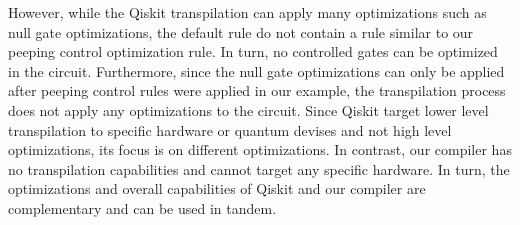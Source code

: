 However, while the Qiskit transpilation can apply many optimizations such as null gate optimizations, the default rule do not contain a rule similar to our peeping control optimization rule. In turn, no controlled gates can be optimized in the circuit. Furthermore, since the null gate optimizations can only be applied after peeping control rules were applied in our example, the transpilation process does not apply any optimizations to the circuit. Since Qiskit target lower level transpilation to specific hardware or quantum devises and not high level optimizations, its focus is on different optimizations. In contrast, our compiler has no transpilation capabilities and cannot target any specific hardware. In turn, the optimizations and overall capabilities of Qiskit and our compiler are complementary and can be used in tandem.
